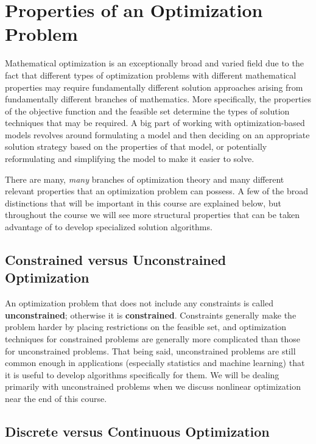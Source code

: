 \documentclass[11pt]{article}
\theoremstyle{definition} %
\begin{document}
\newpage
\section{Properties of an Optimization Problem}
\label{sec:properties}

Mathematical optimization is an exceptionally broad and varied field due to the fact that different types of optimization problems with different mathematical properties may require fundamentally different solution approaches arising from fundamentally different branches of mathematics. More specifically, the properties of the objective function and the feasible set determine the types of solution techniques that may be required. A big part of working with optimization-based models revolves around formulating a model and then deciding on an appropriate solution strategy based on the properties of that model, or potentially reformulating and simplifying the model to make it easier to solve.

There are many, \textit{many} branches of optimization theory and many different relevant properties that an optimization problem can possess. A few of the broad distinctions that will be important in this course are explained below, but throughout the course we will see more structural properties that can be taken advantage of to develop specialized solution algorithms.

\subsection{Constrained versus Unconstrained Optimization}
\label{subsec:constrained}

An optimization problem that does not include any constraints is called \textbf{unconstrained}; otherwise it is \textbf{constrained}. Constraints generally make the problem harder by placing restrictions on the feasible set, and optimization techniques for constrained problems are generally more complicated than those for unconstrained problems. That being said, unconstrained problems are still common enough in applications (especially statistics and machine learning) that it is useful to develop algorithms specifically for them. We will be dealing primarily with unconstrained problems when we discuss nonlinear optimization near the end of this course.

\subsection{Discrete versus Continuous Optimization}
\label{subsec:integer}
\end{document}
